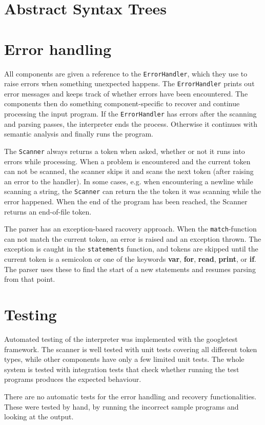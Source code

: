 \documentclass[a4paper]{article}
\newcommand*{\code}[1]{\lstinline{#1}}
\begin{document}
\section{Abstract Syntax Trees}

\section{Error handling}

All components are given a reference to the \code{ErrorHandler}, 
which they use to raise errors when something unexpected happens.
The \code{ErrorHandler} prints out error messages and keeps track 
of whether errors have been encountered. 
The components then do something component-specific to recover and 
continue processing the input program. If the \code{ErrorHandler} 
has errors after the scanning and parsing passes, the interpreter 
ends the process. Otherwise it continues with semantic analysis 
and finally runs the program.

The \code{Scanner} always returns a token when asked, whether or 
not it runs into errors while processing. When a problem is 
encountered and the current token can not be scanned, the scanner 
skips it and scans the next token (after raising an error to the 
handler). In some cases, e.g. when encountering a newline while 
scanning a string, the \code{Scanner} can return the the token it 
was scanning while the error happened. When the end of the 
program has been reached, the Scanner returns an end-of-file token.

The parser has an exception-based racovery approach. When the 
\code{match}-function can not match the current token, an error 
is raised and an exception thrown. The exception is caught 
in the \code{statements} function, and tokens are skipped until
the current token is a semicolon or one of the keywords 
\textbf{var}, \textbf{for}, \textbf{read}, \textbf{print}, 
or \textbf{if}. The parser uses these to find the start of a 
new statements and resumes parsing from that point.

\section{Testing}

Automated testing of the interpreter was implemented with the 
googletest framework. The scanner is well tested with unit tests 
covering all different token types, while other components have 
only a few limited unit tests. The whole system is tested with 
integration tests that check whether running the test programs 
produces the expected behaviour. 

There are no automatic tests for the error handling and recovery 
functionalities. These were tested by hand, by running the incorrect 
sample programs and looking at the output.
\end{document}
